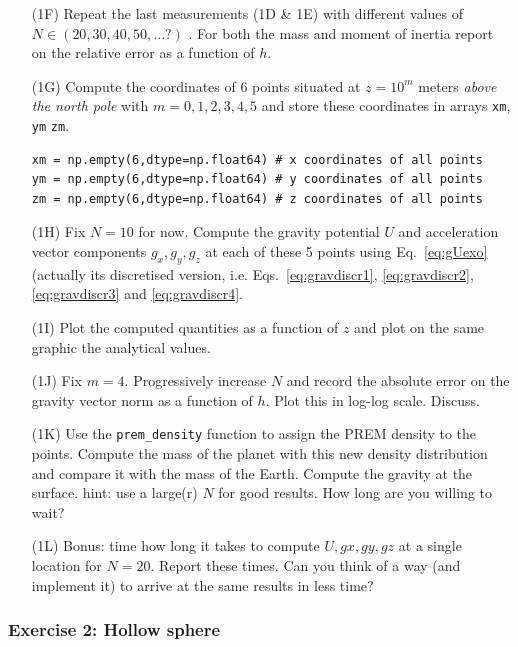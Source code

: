 \begin{itemize}
\item[(1F)] Repeat the last measurements (1D \& 1E) with different values of $N\in(20,30,40,50,...?)$ .
For both the mass and moment of inertia report on the relative error as a function of $h$.

\item[(1G)] Compute the coordinates of 6 points situated at $z=10^m$ meters 
{\it above the north pole} with $m=0,1,2,3,4,5$ and 
store these coordinates in arrays {\tt xm}, {\tt ym} {\tt zm}. 
\begin{lstlisting}
xm = np.empty(6,dtype=np.float64) # x coordinates of all points
ym = np.empty(6,dtype=np.float64) # y coordinates of all points
zm = np.empty(6,dtype=np.float64) # z coordinates of all points
\end{lstlisting}

\item[(1H)] Fix $N=10$ for now. Compute the gravity potential $U$ and acceleration vector 
components $g_x,g_y,g_z$ at each of these 5 points using Eq.~\eqref{eq:gUexo} (actually its 
discretised version, i.e. Eqs.~\eqref{eq:gravdiscr1}, \eqref{eq:gravdiscr2}, 
\eqref{eq:gravdiscr3} and \eqref{eq:gravdiscr4}.
 
\item[(1I)] Plot the computed quantities as a function of $z$ and plot on 
the same graphic the analytical values. 

\item[(1J)] Fix $m=4$. Progressively increase $N$ and record the absolute error on the gravity vector norm 
as a function of $h$. Plot this in log-log scale. Discuss.

\item[(1K)] Use the {\tt prem\_density} function to assign the PREM \cite{dzan81} density to the points. 
Compute the mass of the planet with this 
new density distribution and compare it with the mass of the Earth. Compute the gravity at the surface.
hint: use a large(r) $N$ for good results. How long are you willing to wait? 

\item[(1L)] Bonus: time how long it takes to compute $U,gx,gy,gz$ at a single location for $N=20$. Report these times. 
Can you think of a way (and implement it) to arrive at the same results in less time?  

\end{itemize}

\subsubsection*{Exercise 2: Hollow sphere}

